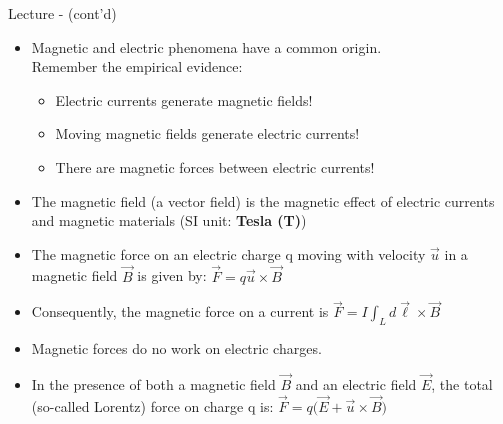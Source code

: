 %
%
%
\begin{frame}{Lecture \summarizedlecture - \lecturesummarytitle (cont'd)}

\begin{itemize}

\item Magnetic and electric phenomena have a common origin.\\
          Remember the empirical evidence:
         \begin{itemize}
            \item Electric currents generate magnetic fields!
            \item Moving magnetic fields generate electric currents!
            \item There are magnetic forces between electric currents!
          \end{itemize}

\item The magnetic field (a vector field) is the magnetic effect of electric currents and magnetic materials (SI unit:  {\bf Tesla (T)})

\item The magnetic force on an electric charge q moving with velocity $\vec{u}$ in a magnetic field $\vec{B}$ is given by:
          $\vec{F} = q \vec{u} \times \vec{B}$

\item Consequently, the magnetic force on a current is
          $\vec{F} = I \int_{L} d\vec{\ell} \times \vec{B}$

\item Magnetic forces do no work on electric charges.

\item In the presence of both a magnetic field $\vec{B}$ and an electric field $\vec{E}$,
          the total (so-called Lorentz) force on charge q is:
          $\vec{F} = q \Big( \vec{E} + \vec{u} \times \vec{B} \Big)$

\end{itemize}

\end{frame}

